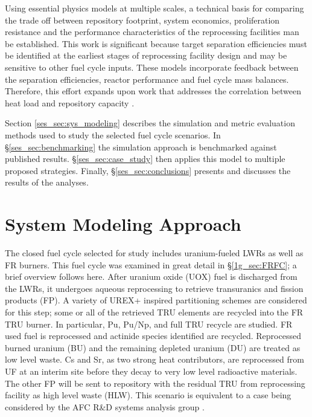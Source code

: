 Using essential physics models at multiple scales,
a technical basis for comparing the trade off between
repository footprint, system economics, proliferation resistance and
the performance characteristics of the reprocessing facilities man be established.  This
work is significant because target separation efficiencies must be
identified at the earliest stages of reprocessing facility design
and may be sensitive to other fuel cycle inputs.  These
models incorporate feedback between the separation efficiencies, reactor
performance and fuel cycle mass balances.  Therefore, this effort
expands upon work that addresses the correlation between heat load
and repository capacity \cite{repmodel}.  

Section \ref{ses_sec:sys_modeling} describes the simulation and metric evaluation
methods used to study the selected fuel cycle scenarios.  In \S \ref{ses_sec:benchmarking}
the simulation approach is benchmarked against published results. \S \ref{ses_sec:case_study}
then applies this model to multiple proposed strategies.
Finally, \S \ref{ses_sec:conclusions} presents and discusses the results of the analyses.


\section{System Modeling Approach}
\label{ses_sec:sys_modeling}
The closed fuel cycle selected for study includes uranium-fueled LWRs
as well as FR burners.  This fuel cycle was examined in great detail in 
\S \ref{1g_sec:FRFC}; a brief overview follows here.  After uranium oxide 
(UOX) fuel is discharged from the LWRs, it undergoes aqueous reprocessing 
to retrieve transuranics and fission products (FP).  A variety of UREX+ inspired
partitioning schemes are considered for this step; some or all of the
retrieved TRU elements are recycled into the FR TRU burner.  In
particular, Pu, Pu/Np, and full TRU recycle are studied.  FR used fuel
is reprocessed and actinide species identified are
recycled. Reprocessed burned uranium (BU) and the remaining depleted uranium (DU) 
are treated as low level waste. Cs and Sr, as two strong heat contributors, are
reprocessed from UF at an interim site before they decay to very low
level radioactive materials. The other FP will be sent to repository
with the residual TRU from reprocessing facility as high level waste
(HLW).  This scenario is equivalent to a case being considered by the
AFC R\&D systems analysis group \cite{Piet2004}. 


